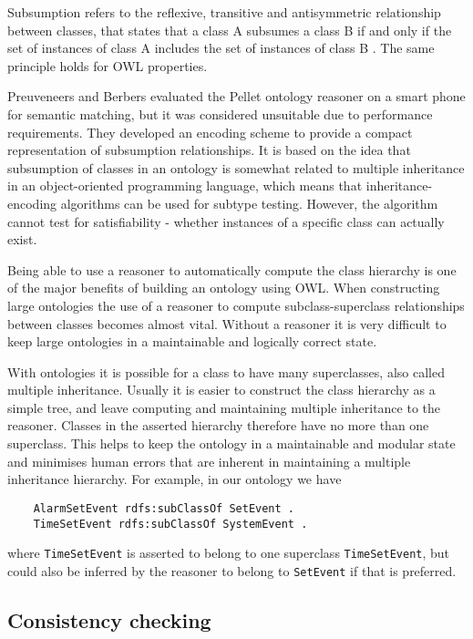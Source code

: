 Subsumption refers to the reflexive, transitive and antisymmetric relationship between classes, that states that a class A subsumes a class B if and only if the set of instances of class A includes the set of instances of class B \cite{Preuveneers2008}. The same principle holds for \ac{OWL} properties.

Preuveneers and Berbers \cite{Preuveneers2008} evaluated the Pellet ontology reasoner on a smart phone for semantic matching, but it was considered unsuitable due to performance requirements. They developed an encoding scheme to provide a compact representation of subsumption relationships. It is based on the idea that subsumption of classes in an ontology is somewhat related to multiple inheritance in an object-oriented programming language, which means that in\-heritance-en\-coding algorithms can be used for subtype testing. However, the algorithm cannot test for satisfiability - whether instances of a specific class can actually exist. 

Being able to use a reasoner to automatically compute the class hierarchy is one of the major benefits of building an ontology using \ac{OWL}. When constructing large ontologies the use of a reasoner to compute subclass-superclass relationships between classes becomes almost vital. Without a reasoner it is very difficult to keep large ontologies in a maintainable and logically correct state. 

With ontologies it is possible for a class to have many superclasses, also called multiple inheritance. Usually it is easier to construct the class hierarchy as a simple tree, and leave computing and maintaining multiple inheritance to the reasoner. Classes in the asserted hierarchy therefore have no more than one superclass. This helps to keep the ontology in a maintainable and modular state and minimises human errors that are inherent in maintaining a multiple inheritance hierarchy. For example, in our ontology we have 

\begin{verbatim}
	AlarmSetEvent rdfs:subClassOf SetEvent .
	TimeSetEvent rdfs:subClassOf SystemEvent .
\end{verbatim}

where \texttt{TimeSetEvent} is asserted to belong to one superclass \texttt{TimeSetEvent}, but could also be inferred by the reasoner to belong to \texttt{SetEvent} if that is preferred.


\subsection{Consistency checking}

